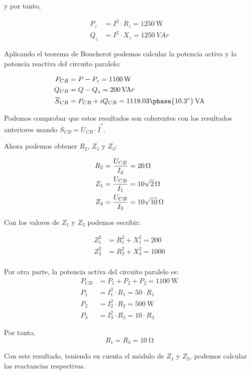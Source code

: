 y por tanto,

\begin{align*}
P_z &= I^2 \cdot R_z = \qty{1250}{\watt}\\
Q_z &= I^2 \cdot X_z = \qty{1250}{VA}r
\end{align*}

Aplicando el teorema de Boucherot podemos calcular la potencia activa
y la potencia reactiva del circuito paralelo:

\begin{align*}
P_{CB} &= P - P_z = \qty{1100}{\watt}\\
Q_{CB} &= Q - Q_z = \qty{200}{VA}r\\
\overline{S}_{CB} &= P_{CB} + i Q_{CB} = \qty[parse-numbers=false]{1118.03\phase{\ang{10.3}}}{VA}
\end{align*}

Podemos comprobar que estos resultados son coherentes con los
resultados anteriores usando $\overline{S}_{CB} = \overline{U}_{CB}
\cdot \overline{I}^*$.


Ahora podemos obtener $R_2$, $Z_1$ y $Z_3$:

\begin{align*}
  R_2 &= \frac{U_{CB}}{I_2} = \qty{20}{\ohm}\\
  Z_1 &= \frac{U_{CB}}{I_1} = \qty[parse-numbers=false]{10\sqrt{2}}{\ohm}\\
  Z_3 &= \frac{U_{CB}}{I_3} = \qty[parse-numbers=false]{10\sqrt{10}}{\ohm}
\end{align*}

Con los valores de $Z_1$ y $Z_3$ podemos escribir:

\begin{align*}
  Z_1^2 &= R_1^2 + X_1^2 = 200\\
  Z_3^2 &= R_3^2 + X_3^2 = 1000\\
\end{align*}

Por otra parte, la potencia activa del circuito paralelo es:
\begin{align*}
  P_{CB} &= P_1 + P_2 + P_2 =\qty{1100}{\watt}\\
  P_1 &= I_1^2 \cdot R_1 = 50 \cdot R_1\\
  P_2 &= I_2^2 \cdot R_2 = \qty{500}{\watt}\\
  P_3 &= I_3^2 \cdot R_3 = 10 \cdot R_3
\end{align*}

Por tanto, 
\[
   R_1 = R_3 = \qty{10}{\ohm}              
\]

Con este resultado, teniendo en cuenta el módulo de $Z_1$ y $Z_3$,
podemos calcular las reactancias respectivas.

